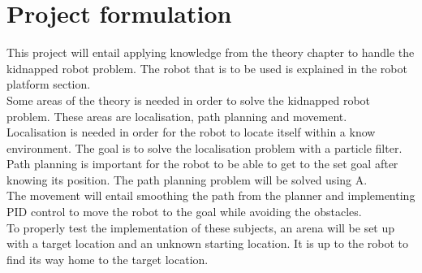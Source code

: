 \section{Project formulation}
This project will entail applying knowledge from the theory chapter to handle the kidnapped robot problem. The robot that is to be used is explained in the robot platform section.\\
Some areas of the theory is needed in order to solve the kidnapped robot problem. 
These areas are localisation, path planning and movement. \\
Localisation is needed in order for the robot to locate itself within a know environment. The goal is to solve the localisation problem with a particle filter.\\
Path planning is important for the robot to be able to get to the set goal after knowing its position. The path planning problem will be solved using A\text{*}.\\
The movement will entail smoothing the path from the planner and implementing PID control to move the robot to the goal while avoiding the obstacles.\\
To properly test the implementation of these subjects, an arena will be set up with a target location and an unknown starting location. It is up to the robot to find its way home to the target location.